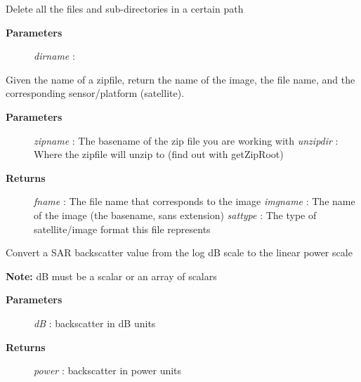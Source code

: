 \documentclass[letterpaper,10pt,english]{sphinxmanual}
\begin{document}

\begin{fulllineitems}
\label{code:Util.deltree}
Delete all the files and sub-directories in a certain path
\begin{description}
\item[{\textbf{Parameters}}] \leavevmode
\emph{dirname}   :

\end{description}

\end{fulllineitems}


\begin{fulllineitems}
\label{code:Util.getFilename}
Given the name of a zipfile, return the name of the image,
the file name, and the corresponding sensor/platform (satellite).
\begin{description}
\item[{\textbf{Parameters}}] \leavevmode
\emph{zipname}   : The basename of the zip file you are working with
\emph{unzipdir}  : Where the zipfile will unzip to (find out with getZipRoot)

\item[{\textbf{Returns}}] \leavevmode
\emph{fname} :  The file name that corresponds to the image
\emph{imgname}   : The name of the image (the basename, sans extension)
\emph{sattype}   : The type of satellite/image format this file represents

\end{description}

\end{fulllineitems}


\begin{fulllineitems}
\label{code:Util.getPowerScale}
Convert a SAR backscatter value from the log dB scale to the linear power scale

\textbf{Note:} dB must be a scalar or an array of scalars
\begin{description}
\item[{\textbf{Parameters}}] \leavevmode
\emph{dB}     :  backscatter in dB units

\item[{\textbf{Returns}}] \leavevmode
\emph{power}   :  backscatter in power units

\end{description}

\end{fulllineitems}
\end{document}
